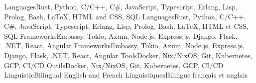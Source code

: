     \resumeEnumerationStart
        \resumeEnumerationEnFr
            {Languages}{Rust, Python, C/C++, C\#, JavaScript, Typescript, Erlang, Lisp, Prolog, Bash, LaTeX, HTML and CSS, SQL}
            {Languages}{Rust, Python, C/C++, C\#, JavaScript, Typescript, Erlang, Lisp, Prolog, Bash, LaTeX, HTML et CSS, SQL}
        \resumeEnumerationEnFr
            {Frameworks}{Embassy, Tokio, Axum, Node.js, Express.js, Django, Flask, .NET, React, Angular}
            {Frameworks}{Embassy, Tokio, Axum, Node.js, Express.js, Django, Flask, .NET, React, Angular}
        \resumeEnumerationEnFr
            {Tools}{Docker, Nix/NixOS, Git, Kubernetes, GCP, CI/CD}
            {Outils}{Docker, Nix/NixOS, Git, Kubernetes, GCP, CI/CD}
        \resumeEnumerationEnFr
            {Linguistic}{Bilingual English and French}
            {Linguistiques}{Bilingue français et anglais}
    \resumeEnumerationEnd


